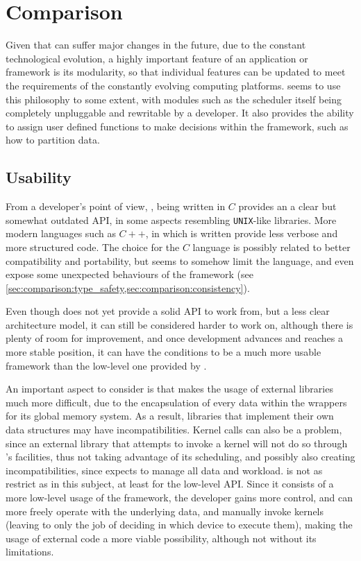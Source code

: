 \documentclass[main.tex]{subfiles}
\begin{document}
\section{Comparison} \label{sec:comparison}

Given that \hetplats can suffer major changes in the future, due to the constant technological evolution, a highly important feature of an application or framework is its modularity, so that individual features can be updated to meet the requirements of the constantly evolving computing platforms. \starpu seems to use this philosophy to some extent, with modules such as the scheduler itself being completely unpluggable and rewritable by a developer. It also provides the ability to assign user defined functions to make decisions within the framework, such as how to partition data.

\subsection{Usability}

From a developer's point of view, \starpu, being written in $C$ provides an a clear but somewhat outdated API, in some aspects resembling \texttt{UNIX}-like libraries. More modern languages such as $C++$, in which \gama is written provide less verbose and more structured code. The choice for the $C$ language is possibly related to better compatibility and portability, but seems to somehow limit the language, and even expose some unexpected behaviours of the framework (see \cref{sec:comparison:type_safety,sec:comparison:consistency}).

Even though \gama does not yet provide a solid API to work from, but a less clear architecture model, it can still be considered harder to work on, although there is plenty of room for improvement, and once development advances and reaches a more stable position, it can have the conditions to be a much more usable framework than the low-level one provided by \starpu.

An important aspect to consider is that \gama makes the usage of external libraries much more difficult, due to the encapsulation of every data within the wrappers for its global memory system. As a result, libraries that implement their own data structures may have incompatibilities. Kernel calls can also be a problem, since an external library that attempts to invoke a \cuda kernel will not do so through \gama's facilities, thus not taking advantage of its scheduling, and possibly also creating incompatibilities, since \gama expects to manage all data and workload.
\starpu is not as restrict as \gama in this subject, at least for the low-level API. Since it consists of a more low-level usage of the framework, the developer gains more control, and can more freely operate with the underlying data, and manually invoke kernels (leaving to \starpu only the job of deciding in which device to execute them), making the usage of external code a more viable possibility, although not without its limitations.
\end{document}
